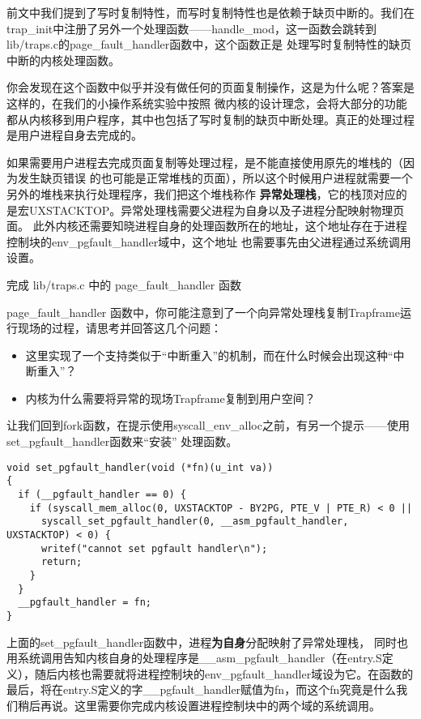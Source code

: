 前文中我们提到了写时复制特性，而写时复制特性也是依赖于缺页中断的。我们在trap\_init中注册了另外一个处理函数——handle\_mod，这一函数会跳转到lib/traps.c的page\_fault\_handler函数中，这个函数正是
处理写时复制特性的缺页中断的内核处理函数。

你会发现在这个函数中似乎并没有做任何的页面复制操作，这是为什么呢？答案是这样的，在我们的小操作系统实验中按照
微内核的设计理念，会将大部分的功能都从内核移到用户程序，其中也包括了写时复制的缺页中断处理。真正的处理过程
是用户进程自身去完成的。

如果需要用户进程去完成页面复制等处理过程，是不能直接使用原先的堆栈的（因为发生缺页错误
的也可能是正常堆栈的页面），所以这个时候用户进程就需要一个另外的堆栈来执行处理程序，我们把这个堆栈称作
\textbf{异常处理栈}，它的栈顶对应的是宏UXSTACKTOP。异常处理栈需要父进程为自身以及子进程分配映射物理页面。
此外内核还需要知晓进程自身的处理函数所在的地址，这个地址存在于进程控制块的env\_pgfault\_handler域中，这个地址
也需要事先由父进程通过系统调用设置。

\begin{exercise}
完成 lib/traps.c 中的 page\_fault\_handler 函数
\end{exercise}

\begin{thinking}\label{think:pgfault-kernel}
page\_fault\_handler 函数中，你可能注意到了一个向异常处理栈复制Trapframe运行现场的过程，请思考并回答这几个问题：
\begin{itemize}
  \item 这里实现了一个支持类似于“中断重入”的机制，而在什么时候会出现这种“中断重入”？
  \item 内核为什么需要将异常的现场Trapframe复制到用户空间？
\end{itemize}
\end{thinking}

让我们回到fork函数，在提示使用syscall\_env\_alloc之前，有另一个提示——使用set\_pgfault\_handler函数来“安装”
处理函数。
\begin{verbatim}
void set_pgfault_handler(void (*fn)(u_int va))
{
  if (__pgfault_handler == 0) {
    if (syscall_mem_alloc(0, UXSTACKTOP - BY2PG, PTE_V | PTE_R) < 0 ||
      syscall_set_pgfault_handler(0, __asm_pgfault_handler, UXSTACKTOP) < 0) {
      writef("cannot set pgfault handler\n");
      return;
    }
  }
  __pgfault_handler = fn;
}
\end{verbatim}

上面的set\_pgfault\_handler函数中，进程\textbf{为自身}分配映射了异常处理栈，
同时也用系统调用告知内核自身的处理程序是\_\_asm\_pgfault\_handler（在entry.S定义），随后内核也需要就将进程控制块的env\_pgfault\_handler域设为它。在函数的最后，将在entry.S定义的字\_\_pgfault\_handler赋值为fn，而这个fn究竟是什么我们稍后再说。这里需要你完成内核设置进程控制块中的两个域的系统调用。

